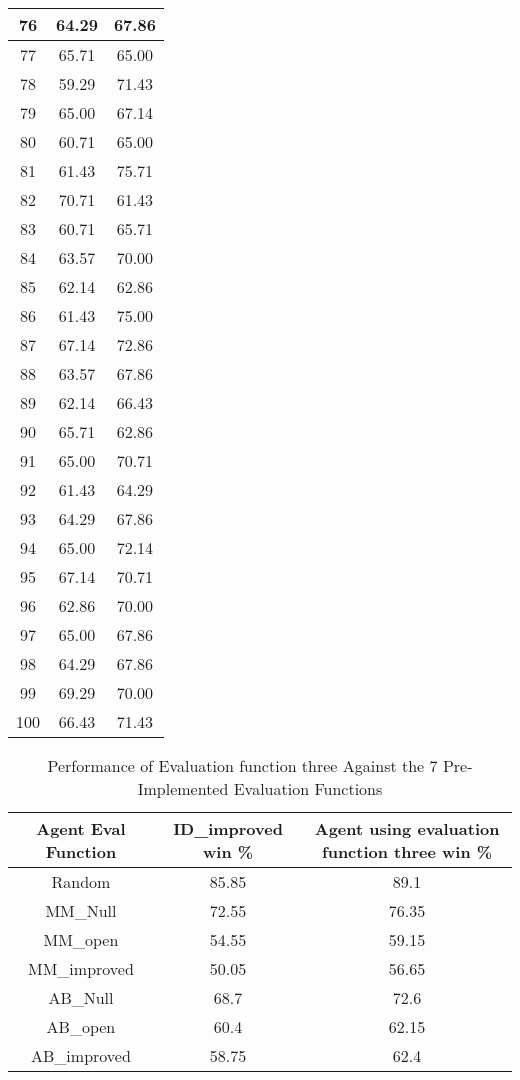 \documentclass[11pt]{article}
\begin{document}
\begin{longtable}[c]{| c | c |c |}
76 & 64.29 & 67.86 \\ \hline
77 & 65.71 & 65.00 \\ \hline
78 & 59.29 & 71.43 \\ \hline
79 & 65.00 & 67.14 \\ \hline
80 & 60.71 & 65.00 \\ \hline
81 & 61.43 & 75.71 \\ \hline
82 & 70.71 & 61.43 \\ \hline
83 & 60.71 & 65.71 \\ \hline
84 & 63.57 & 70.00 \\ \hline
85 & 62.14 & 62.86 \\ \hline
86 & 61.43 & 75.00 \\ \hline
87 & 67.14 & 72.86 \\ \hline
88 & 63.57 & 67.86 \\ \hline
89 & 62.14 & 66.43 \\ \hline
90 & 65.71 & 62.86 \\ \hline
91 & 65.00 & 70.71 \\ \hline
92 & 61.43 & 64.29 \\ \hline
93 & 64.29 & 67.86 \\ \hline
94 & 65.00 & 72.14 \\ \hline
95 & 67.14 & 70.71 \\ \hline
96 & 62.86 & 70.00 \\ \hline
97 & 65.00 & 67.86 \\ \hline
98 & 64.29 & 67.86 \\ \hline
99 & 69.29 & 70.00 \\ \hline
100 & 66.43 & 71.43 \\ \hline
\end{longtable}

\begin{table}[h!]
\caption{Performance of Evaluation function three Against the 7 Pre-Implemented Evaluation Functions}
\centering
\begin{tabular}{||c | c| c||} 
 \hline
Agent Eval Function & ID\_improved win \% & Agent using evaluation function three win \% \\ \hline
Random & 85.85 & 89.1 \\ \hline
MM\_Null & 72.55 & 76.35 \\ \hline
MM\_open & 54.55 & 59.15 \\ \hline
MM\_improved & 50.05 & 56.65 \\ \hline
AB\_Null & 68.7 & 72.6 \\ \hline
AB\_open & 60.4 & 62.15 \\ \hline
AB\_improved & 58.75 & 62.4 \\ \hline
\end{tabular}
\label{eval_fun3}
\end{table}
\end{document}

